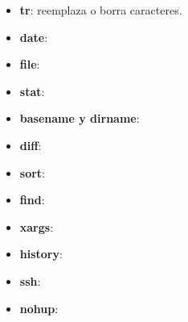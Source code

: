 \documentclass{config/apuntes}
\begin{document}
\begin{itemize}
\item \textbf{tr}: reemplaza o borra caracteres.

\item \textbf{date}: 

\item \textbf{file}: 

\item \textbf{stat}: 

\item \textbf{basename y dirname}: 

\item \textbf{diff}: 

\item \textbf{sort}: 

\item \textbf{find}: 

\item \textbf{xargs}: 

\item \textbf{history}: 

\item \textbf{ssh}: 

\item \textbf{nohup}: 
\end{itemize}
\end{document}
